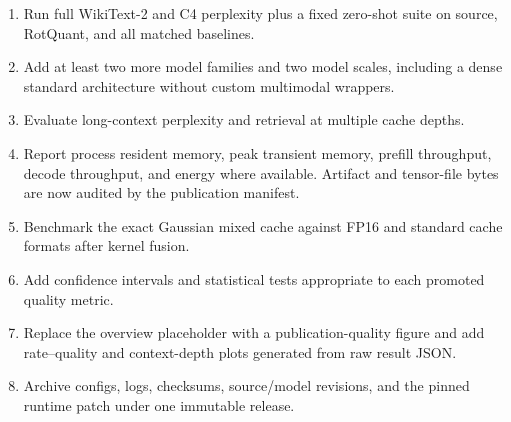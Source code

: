 \documentclass[10pt,twocolumn]{article}
\begin{document}
\begin{enumerate}
  \item Run full WikiText-2 and C4 perplexity plus a fixed zero-shot suite on
  source, RotQuant, and all matched baselines.
  \item Add at least two more model families and two model scales, including a
  dense standard architecture without custom multimodal wrappers.
  \item Evaluate long-context perplexity and retrieval at multiple cache depths.
  \item Report process resident memory, peak transient memory, prefill
  throughput, decode throughput, and energy where available. Artifact and
  tensor-file bytes are now audited by the publication manifest.
  \item Benchmark the exact Gaussian mixed cache against FP16 and standard
  cache formats after kernel fusion.
  \item Add confidence intervals and statistical tests appropriate to each
  promoted quality metric.
  \item Replace the overview placeholder with a publication-quality figure and
  add rate--quality and context-depth plots generated from raw result JSON.
  \item Archive configs, logs, checksums, source/model revisions, and the pinned
  runtime patch under one immutable release.
\end{enumerate}
\end{document}
